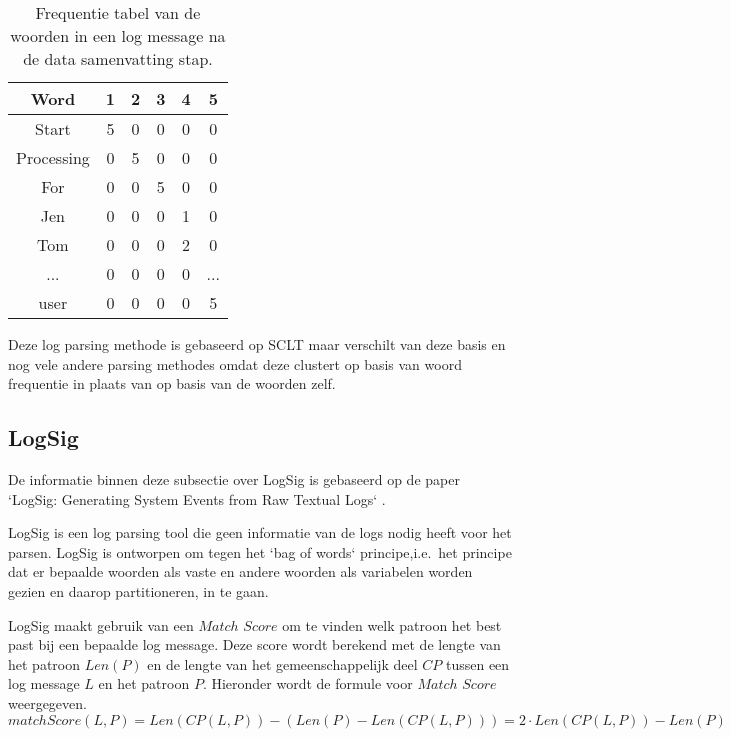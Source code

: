 \begin{table}
    \caption{Frequentie tabel van de woorden in een log message na de data samenvatting stap.}
    \begin{center}
        \begin{tabular}{||c c c c c c||} 
            \hline
            Word & 1 & 2 & 3 & 4 & 5 \\
            \hline\hline
            Start & 5 & 0 & 0 & 0 & 0 \\ 
            \hline
            Processing & 0 & 5 & 0 & 0 & 0 \\
            \hline
            For & 0 & 0 & 5 & 0 & 0 \\
            \hline
            Jen & 0 & 0 & 0 & 1 & 0 \\
            \hline
            Tom & 0 & 0 & 0 & 2 & 0 \\
            \hline
            ... & 0 & 0 & 0 & 0 & ... \\
            \hline
            user & 0 & 0 & 0 & 0 & 5 \\
            \hline
        \end{tabular}
    \end{center}
\end{table}

Deze log parsing methode is gebaseerd op SCLT maar verschilt van deze basis en nog vele andere parsing methodes omdat deze clustert op basis van woord frequentie in plaats van op basis van de woorden zelf.

\subsection{LogSig}
De informatie binnen deze subsectie over LogSig is gebaseerd op de paper `LogSig: Generating System Events from Raw Textual Logs` \autocite{tang2011logsig}.

LogSig is een log parsing tool die geen informatie van de logs nodig heeft voor het parsen. LogSig is ontworpen om tegen het `bag of words` principe,i.e.\ het principe dat er bepaalde woorden als vaste en andere woorden als variabelen worden gezien en daarop partitioneren, in te gaan. 

LogSig maakt gebruik van een $Match$ $Score$ om te vinden welk patroon het best past bij een bepaalde log message. Deze score wordt berekend met de lengte van het patroon $Len(P)$ en de lengte van het gemeenschappelijk deel $CP$ tussen een log message $L$ en het patroon $P$. Hieronder wordt de formule voor $Match$ $Score$ weergegeven.\\
\(matchScore(L, P) = Len(CP(L,P)) - (Len(P) - Len(CP(L,P))) = 2 \cdot Len(CP(L,P)) - Len(P)\)\\

